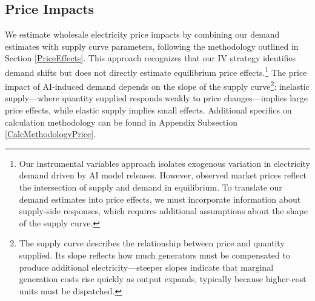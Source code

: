 \documentclass[sigconf]{acmart}
\newcommand{\nb}[1]{\textcolor{blue}{NB[#1]}}
\begin{document}



\subsection{Price Impacts}


We estimate wholesale electricity price impacts by combining our demand estimates with supply curve parameters, following the methodology outlined in Section \ref{PriceEffects}. This approach recognizes that our IV strategy identifies demand shifts but does not directly estimate equilibrium price effects.\footnote{Our instrumental variables approach isolates exogenous variation in electricity demand driven by AI model releases. However, observed market prices reflect the intersection of supply and demand in equilibrium. To translate our demand estimates into price effects, we must incorporate information about supply-side responses, which requires additional assumptions about the shape of the supply curve.} The price impact of AI-induced demand depends on the slope of the supply curve\footnote{The supply curve describes the relationship between price and quantity supplied. Its slope reflects how much generators must be compensated to produce additional electricity—steeper slopes indicate that marginal generation costs rise quickly as output expands, typically because higher-cost units must be dispatched.}: inelastic supply—where quantity supplied responds weakly to price changes—implies large price effects, while elastic supply implies small effects. Additional specifics on calculation methodology can be found in Appendix Subsection \ref{CalcMethodologyPrice}.
\end{document}
